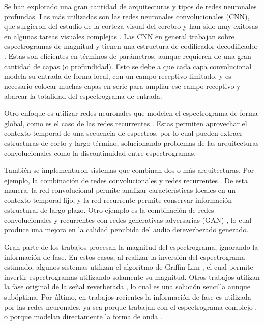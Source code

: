 Se han explorado una gran cantidad de arquitecturas y tipos de redes neuronales profundas. Las más utilizadas son las redes neuronales convolucionales (CNN), que surgieron del estudio de la corteza visual del cerebro y han sido muy exitosas en algunas tareas visuales complejas \cite{lagartija}.  Las CNN en general trabajan sobre espectrogramas de magnitud y tienen una estructura de codificador-decodificador \cite{FCN}. Estas son eficientes en términos de parámetros, aunque requieren de una gran cantidad de capas (o profundidad). Esto se debe a que cada capa convolucional modela su entrada de forma local, con un campo receptivo limitado, y es necesario colocar muchas capas en serie para ampliar ese campo receptivo y abarcar la totalidad del espectrograma de entrada. 

Otro enfoque es utilizar redes neuronales que modelen el espectrograma de forma global, como es el caso de las redes recurrentes \cite{RNN}. Estas permiten aprovechar el contexto temporal de una secuencia de espectros, por lo cual pueden extraer estructuras de corto y largo término, solucionando problemas de las arquitecturas convolucionales como la discontinuidad entre espectrogramas.


También se implementaron sistemas que combinan dos o más arquitecturas. Por ejemplo, la combinación de redes convolucionales y redes recurrentes \cite{RNN+CNN}. De esta manera, la red convolucional permite analizar características locales en un contexto temporal fijo, y la red recurrente permite conservar información estructural de largo plazo. Otro ejemplo es la combinación de redes convolucionales y recurrentes con redes generativas adversarias (GAN) \cite{GAN}, lo cual produce una mejora en la calidad percibida del audio dereverberado generado. 

Gran parte de los trabajos procesan la magnitud del espectrograma, ignorando la información de fase. En estos casos, al realizar la inversión del espectrograma estimado, algunos sistemas \cite{ezeKun} utilizan el algoritmo de Griffin Lim \cite{griffinlim}, el cual permite invertir espectrogramas utilizando solamente su magnitud. Otros trabajos utilizan la fase original de la señal reverberada \cite{CNN, FCN}, lo cual es una solución sencilla aunque subóptima. Por último, en trabajos recientes la información de fase es utilizada por las redes neuronales, ya sea porque trabajan con el espectrograma complejo \cite{cIRM}, o porque modelan directamente la forma de onda \cite{hifiGAN}.